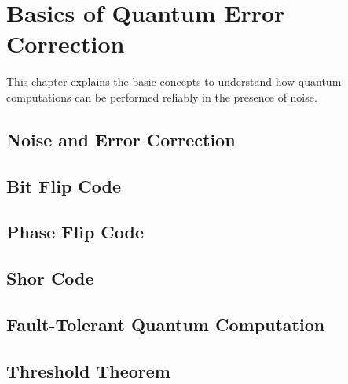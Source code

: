 %
%
\chapter {Basics of Quantum Error Correction}

This chapter explains the basic concepts to understand how quantum computations can be performed reliably in the presence of noise.

\section{Noise and Error Correction}

\section{Bit Flip Code}

\section{Phase Flip Code}

\section{Shor Code}

\section{Fault-Tolerant Quantum Computation}

\section{Threshold Theorem}

